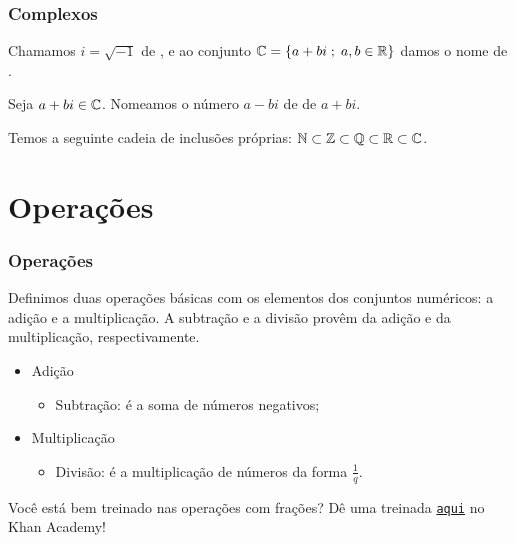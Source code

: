 \documentclass[brazil, notheorems, 10pt]{beamer}
\begin{document}
\begin{frame}
\frametitle{Complexos} %
\begin{Def}
Chamamos $i = \sqrt {-1}$ de , e ao conjunto
$\mathbb{C} = \left\{ a+bi \;;\; a,b \in \mathbb{R}\right\}$ damos o nome de .
\end{Def}

Seja $a+bi \in \mathbb{C}$. Nomeamos o número $a-bi$ de  de
$a+bi$.

Temos a seguinte cadeia de inclusões próprias: $\mathbb{N} \subset \mathbb{Z}
\subset \mathbb{Q} \subset \mathbb{R} \subset \mathbb{C}$.
\end{frame}



\section{Operações}
\begin{frame}
\frametitle{Operações} %
Definimos duas operações básicas com os elementos dos conjuntos
numéricos: a adição e a multiplicação. A subtração e a divisão
provêm da adição e da multiplicação, respectivamente.
\begin{itemize}
	\item Adição
		\begin{itemize}
		\item Subtração: é a soma de números negativos;
		\end{itemize}
	\item Multiplicação
		\begin{itemize}
		\item Divisão: é a multiplicação de números da forma $\frac 1
		q$.
		\end{itemize}
\end{itemize}

Você está bem treinado nas operações com frações? Dê uma treinada
\href{https://pt.khanacademy.org/math/arithmetic-home/arith-review-fractions}
{{\tt aqui}} no Khan Academy!
\end{frame}



\end{document}
